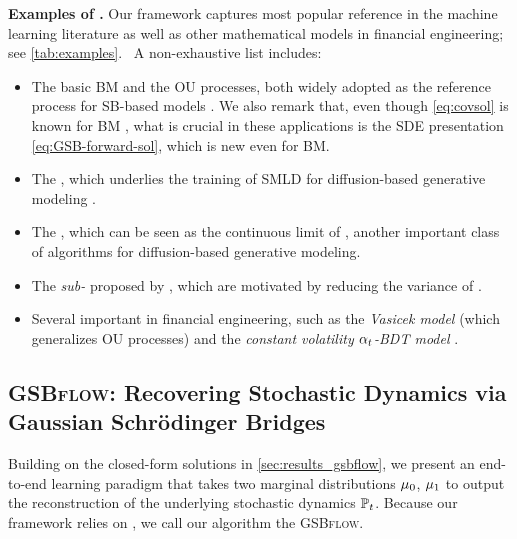 \textbf{Examples of .}
Our framework captures most popular reference  in the machine learning literature as well as other mathematical models in financial engineering; see \cref{tab:examples}.%
~A non-exhaustive list includes:
\begin{itemize}[leftmargin=.5cm,itemsep=.01cm,topsep=0cm]
\item The basic \acrfull{BM} and the \acrfull{OU} processes, both widely adopted as the reference process for \acrshort{SB}-based models \citep{de2021simulating, de2021diffusion, lavenant2021towards, vargas2021solving, wang2021deep}. We also remark that, even though \eqref{eq:covsol} is known for \acrshort{BM} \citep{mallasto2021entropy}, what is crucial in these applications is the \acrshort{SDE} presentation \eqref{eq:GSB-forward-sol}, which is new even for BM.
\item The , which underlies the training of \acrlong{SMLD} for diffusion-based generative modeling \citep{huang2021variational, song2019generative, song2020score}.
\item The , which can be seen as the continuous limit of  \citep{ho2020denoising, sohl2015deep, song2020score}, another important class of algorithms for diffusion-based generative modeling.
\item The \emph{sub-} proposed by \citep{song2020score}, which are motivated by reducing the variance of .
\item Several important  in financial engineering, such as the \emph{Vasicek model} (which generalizes \acrshort{OU} processes) and the \emph{constant volatility $\alpha_{ t }$-\acrfull{BDT} model} \citep{platen2010numerical}. 
\end{itemize}


\subsection{\textsc{GSBflow}: Recovering Stochastic Dynamics via Gaussian Schr{\"o}dinger Bridges}

Building on the closed-form solutions in \cref{sec:results_gsbflow}, we present an end-to-end learning paradigm that takes two marginal distributions $\mu_0$, $\mu_1$ to output the reconstruction of the underlying stochastic dynamics $\mathbb{P}_{{t}}$. Because our framework relies on , we call our algorithm the \textsc{GSBflow}.


